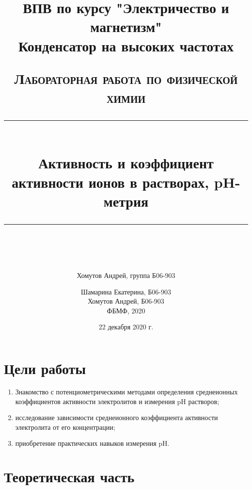 \documentclass[a4paper, 12pt]{article}
\author{Хомутов Андрей, группа Б06-903}
\title{ВПВ по курсу "Электричество и магнетизм" \\ Конденсатор на высоких частотах}
\date{22 декабря 2020 г.}
\newcommand{\HRule}[1]{\rule{\linewidth}{#1}}
\begin{document}
\title{ \normalsize \textsc{Лабораторная работа по физической химии}
		\\ [4.0cm]
		\HRule{0.5pt} \\ [0.3cm]
		\LARGE \textbf{{Активность и коэффициент активности ионов 
		в растворах, pH-метрия}}
		\HRule{0.5pt} \\ [0.1cm]
		\normalsize  \vspace*{18\baselineskip}}

\date{}

\author{Шамарина Екатерина, Б06-903 \\
		Хомутов Андрей, Б06-903 \\
ФБМФ, 2020\\ }

\maketitle
\thispagestyle{empty}
\newpage

\section*{Цели работы} 
\begin{enumerate}
    \item Знакомство с потенциометрическими методами определения среднеионных коэффициентов активности электролитов и измерения pH растворов; 
    \item исследование зависимости среднеионного коэффициента активности электролита от его концентрации; 
    \item приобретение практических навыков измерения pH.
\end{enumerate}

 
\section{Теоретическая часть}
\end{document}
